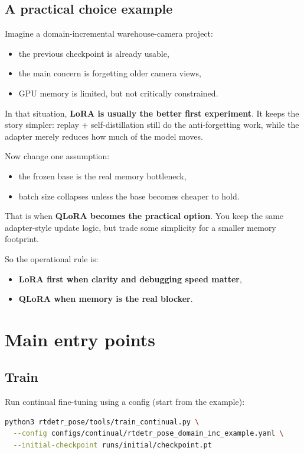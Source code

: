 \subsection{A practical choice example}
Imagine a domain-incremental warehouse-camera project:
\begin{itemize}
  \item the previous checkpoint is already usable,
  \item the main concern is forgetting older camera views,
  \item GPU memory is limited, but not critically constrained.
\end{itemize}

In that situation, \textbf{LoRA is usually the better first experiment}.
It keeps the story simpler: replay + self-distillation still do the anti-forgetting work, while the adapter merely reduces how much of the model moves.

Now change one assumption:
\begin{itemize}
  \item the frozen base is the real memory bottleneck,
  \item batch size collapses unless the base becomes cheaper to hold.
\end{itemize}

That is when \textbf{QLoRA becomes the practical option}.
You keep the same adapter-style update logic, but trade some simplicity for a smaller memory footprint.

So the operational rule is:
\begin{itemize}
  \item \textbf{LoRA first when clarity and debugging speed matter},
  \item \textbf{QLoRA when memory is the real blocker}.
\end{itemize}

\section{Main entry points}
\subsection{Train}
Run continual fine-tuning using a config (start from the example):
\begin{lstlisting}[language=bash]
python3 rtdetr_pose/tools/train_continual.py \
  --config configs/continual/rtdetr_pose_domain_inc_example.yaml \
  --initial-checkpoint runs/initial/checkpoint.pt
\end{lstlisting}

